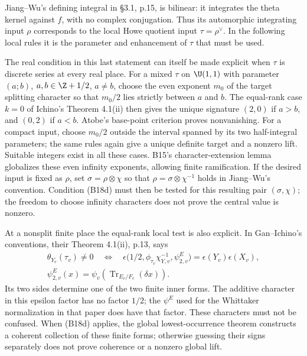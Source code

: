 \documentclass[11pt]{article}
\theoremstyle{definition}\newtheorem{definition}[theorem]{Definition}\newtheorem{remark}[theorem]{Remark}
\begin{document}
Jiang--Wu's defining integral in \S3.1, p.15, is bilinear:
it integrates the theta kernel against $f$, with no complex
conjugation. Thus its automorphic integrating input $\rho$
corresponds to the local Howe quotient input
$\tau=\rho^\vee$. In the following local rules it is the
parameter and enhancement of $\tau$ that must be used.

The real condition in this last statement can itself be made
explicit when $\tau$ is discrete series at every real place.
For a mixed $\tau$ on $\U(1,1)$ with parameter $(a;b)$,
$a,b\in\Z+1/2$, $a\ne b$, choose the even exponent $m_0$ of
the target splitting character so that $m_0/2$ lies strictly
between $a$ and $b$. The equal-rank case $k=0$ of Ichino's
Theorem 4.1(ii) then gives the unique signature $(2,0)$ if
$a>b$, and $(0,2)$ if $a<b$. Atobe's base-point criterion
proves nonvanishing. For a compact input, choose $m_0/2$
outside the interval spanned by its two half-integral parameters;
the same rules again give a unique definite target and a
nonzero lift. Suitable integers exist in all these cases.
B15's character-extension lemma globalizes these even infinity
exponents, allowing finite ramification. If the desired input
is fixed as $\rho$, set $\sigma=\rho\otimes\chi$ so that
$\rho=\sigma\otimes\chi^{-1}$ holds in Jiang--Wu's convention.
Condition (B18d) must then be tested for this resulting pair
$(\sigma,\chi)$; the freedom to choose infinity characters
does not prove the central value is nonzero.

At a nonsplit finite place the equal-rank local test is also
explicit. In Gan--Ichino's conventions, their Theorem 4.1(ii),
p.13, says
\[
 \begin{gathered}
 \theta_{Y_v}(\tau_v)\ne0
 \quad\Longleftrightarrow\quad
 \epsilon\bigl(1/2,\phi_{\tau_v}\chi_{Y,v}^{-1},
                      \psi_{2,v}^E\bigr)
               =\epsilon(Y_v)\epsilon(X_v),\\
 \psi_{2,v}^E(x)=\psi_v(\operatorname{Tr}_{E_v/F_v}(\delta x)).
 \end{gathered}
 \tag{B18e}
\]
Its two sides determine one of the two finite inner forms.
The additive character in this epsilon factor has no factor
$1/2$; the $\psi^E$ used for the Whittaker normalization in
that paper does have that factor. These characters must not be
confused. When (B18d) applies, the global lowest-occurrence
theorem constructs a coherent collection of these finite forms;
otherwise guessing their signs separately does not prove
coherence or a nonzero global lift.
\end{document}
